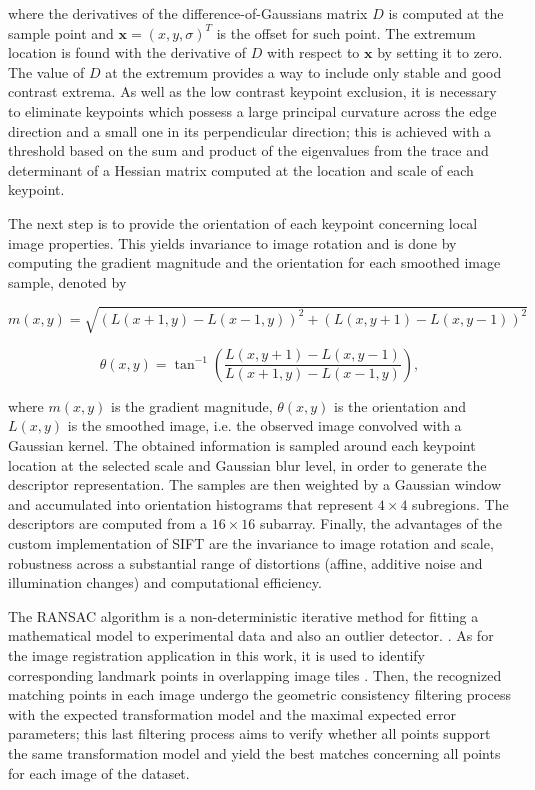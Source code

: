 \noindent where the derivatives of the difference-of-Gaussians matrix $D$ is computed at the sample point and $\mathbf{x} = (x,y,\sigma)^{T}$ is the offset for such point. The extremum location is found with the derivative of $D$ with respect to $\mathbf{x}$ by setting it to zero. The value of $D$ at the extremum provides a way to include only stable and good contrast extrema. As well as the low contrast keypoint exclusion, it is necessary to eliminate keypoints which possess a large principal curvature across the edge direction and a small one in its perpendicular direction; this is achieved with a threshold based on the sum and product of the eigenvalues from the trace and determinant of a Hessian matrix computed at the location and scale of each keypoint.

The next step is to provide the orientation of each keypoint concerning local image properties. This yields invariance to image rotation and is done by computing the gradient magnitude and the orientation for each smoothed image sample, denoted by

\begin{equation}
m(x,y) = \sqrt{(L(x + 1, y) - L(x - 1, y))^{2} + (L(x, y + 1) - L(x, y - 1))^{2}}
\end{equation}

\begin{equation}
\theta(x,y) = \tan^{-1}
			\left(
			\frac{L(x, y + 1) - L(x, y - 1)}
				 {L(x + 1, y) - L(x - 1, y)}
			\right),
\end{equation}

\noindent where $m(x,y)$ is the gradient magnitude, $\theta(x,y)$ is the orientation and $L(x,y)$ is the smoothed image, i.e. the observed image convolved with a Gaussian kernel. The obtained information is sampled around each keypoint location at the selected scale and Gaussian blur level, in order to generate the descriptor representation. The samples are then weighted by a Gaussian window and accumulated into orientation histograms that represent $4 \times 4$ subregions. The descriptors are computed from a $16 \times 16$ subarray. Finally, the advantages of the custom implementation of SIFT are the invariance to image rotation and scale, robustness across a substantial range of distortions (affine, additive noise and illumination changes) and computational efficiency.

The RANSAC algorithm is a non-deterministic iterative method for fitting a mathematical model to experimental data and also an outlier detector. \cite{fischler1981random}. As for the image registration application in this work, it is used to identify corresponding landmark points in overlapping image tiles \cite{saalfeld2019computational}. Then, the recognized matching points in each image undergo the geometric consistency filtering process with the expected transformation model and the maximal expected error parameters; this last filtering process aims to verify whether all points support the same transformation model and yield the best matches concerning all points for each image of the dataset.
